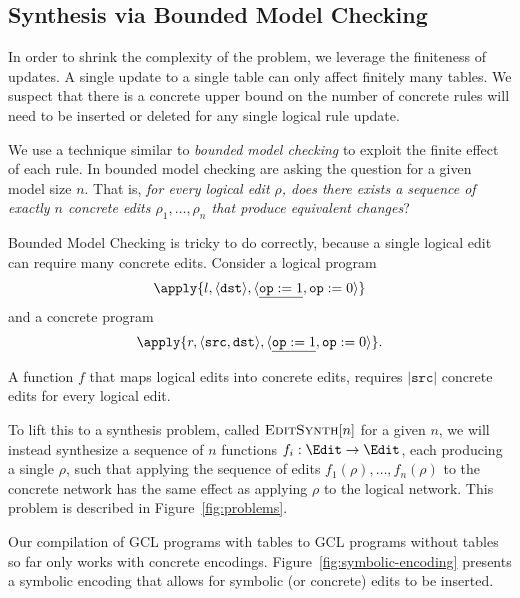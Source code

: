 
\subsection{Synthesis via Bounded Model Checking}


In order to shrink the complexity of the problem, we leverage the finiteness of
updates. A single update to a single table can only affect finitely many
tables. We suspect that there is a concrete upper bound on the number of
concrete rules will need to be inserted or deleted for any single logical rule
update. 

We use a technique similar to \emph{bounded model checking} to exploit the
finite effect of each rule. In bounded model checking are asking the question
for a given model size $n$. That is, \emph{for every logical edit $\rho$, does
  there exists a sequence of exactly $n$ concrete edits $\rho_1, \ldots, \rho_n$
  that produce equivalent changes}?

\begin{example}
  Bounded Model Checking is tricky to do correctly, because a single
  logical edit can require many concrete edits. Consider a logical program
  \[\begin{array}{l}
      \apply{l, \langle  \texttt{dst} \rangle, \langle \underline{\texttt{op} := 1}, \texttt{op} := 0 \rangle}
    \end{array}
  \]
  and a concrete program
  \[\apply{r, \langle \texttt{src}, \texttt{dst} \rangle, \langle \underline{\texttt{op} := 1}, \texttt{op} := 0 \rangle}.\]
  
  A function $f$ that maps logical edits into concrete edits, requires
  $|\texttt{src}|$ concrete edits for every logical edit.
\end{example}

To lift this to a synthesis problem, called $\textsc{EditSynth}[n]$ for a given
$n$, we will instead synthesize a sequence of $n$ functions
$f_i : \Edit \to \Edit$, each producing a single $\rho$, such that applying the
sequence of edits $f_1(\rho), \ldots, f_n(\rho)$ to the concrete network has the
same effect as applying $\rho$ to the logical network. This problem is described
in Figure~\ref{fig:problems}.

Our compilation of GCL programs with tables to GCL programs without tables so
far only works with concrete encodings. Figure~\ref{fig:symbolic-encoding} presents a
symbolic encoding that allows for symbolic (or concrete) edits to be inserted.

